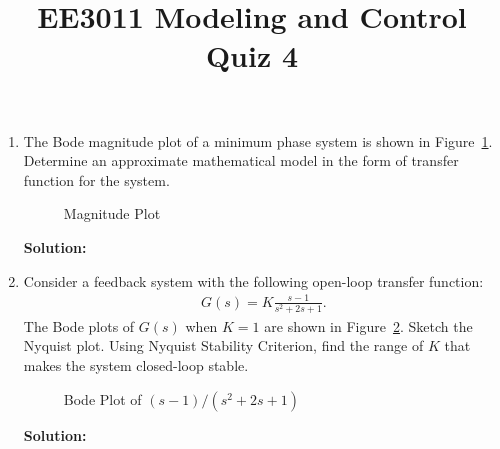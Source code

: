 \documentclass{article}
\title{EE3011 Modeling and Control\\Quiz 4}
\date{}
\newlength\figureheight
\newlength\figurewidth
\newcommand{\tikzdir}[1]{tikz/#1.tikz}
\newcommand{\inputtikz}[1]{}}
\begin{document}
 \maketitle

\begin{enumerate}
\item The Bode magnitude plot of a minimum phase system is shown in Figure~\ref{fig:1}. Determine an approximate mathematical model in the form of transfer function for the system.
  \begin{figure}[ht]
\setlength\figureheight{8cm}
\setlength\figurewidth{14cm}
    \centering
    \inputtikz{Quiz23}
    \caption{Magnitude Plot\label{fig:1}}
  \end{figure}

  {\bf Solution:}
\newpage
\item Consider a feedback system with the following open-loop transfer function:
  \begin{align*}
    G(s) = K\frac{s-1}{s^2+2s+1}.
  \end{align*}
  The Bode plots of $G(s)$ when $K = 1$ are shown in Figure~\ref{fig:2}. Sketch the Nyquist plot. Using Nyquist Stability Criterion, find the range of $K$ that makes the system closed-loop stable.
  \begin{figure}[ht]
\setlength\figureheight{5cm}
\setlength\figurewidth{14cm}
    \centering
    \inputtikz{Quiz24}
    \caption{Bode Plot of $(s-1)/(s^2+2s+1)$\label{fig:2}}
  \end{figure}

  {\bf Solution:}
\end{enumerate}
\end{document}
